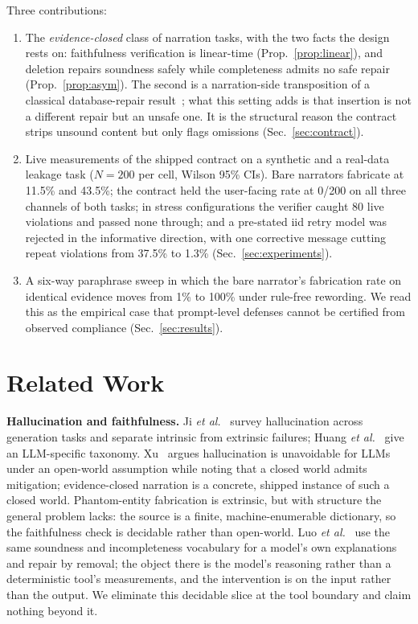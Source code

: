 \documentclass[conference]{IEEEtran}
\begin{document}
Three contributions:
\begin{enumerate}
\item The \emph{evidence-closed} class of narration tasks, with the two facts the design rests on: faithfulness verification is linear-time (Prop.~\ref{prop:linear}), and deletion repairs soundness safely while completeness admits no safe repair (Prop.~\ref{prop:asym}). The second is a narration-side transposition of a classical database-repair result~\cite{chomicki2005minimal}; what this setting adds is that insertion is not a different repair but an unsafe one. It is the structural reason the contract strips unsound content but only flags omissions (Sec.~\ref{sec:contract}).
\item Live measurements of the shipped contract on a synthetic and a real-data leakage task ($N=200$ per cell, Wilson 95\% CIs). Bare narrators fabricate at 11.5\% and 43.5\%; the contract held the user-facing rate at 0/200 on all three channels of both tasks; in stress configurations the verifier caught 80 live violations and passed none through; and a pre-stated iid retry model was rejected in the informative direction, with one corrective message cutting repeat violations from 37.5\% to 1.3\% (Sec.~\ref{sec:experiments}).
\item A six-way paraphrase sweep in which the bare narrator's fabrication rate on identical evidence moves from 1\% to 100\% under rule-free rewording. We read this as the empirical case that prompt-level defenses cannot be certified from observed compliance (Sec.~\ref{sec:results}).
\end{enumerate}

\section{Related Work}
\label{sec:related}
\textbf{Hallucination and faithfulness.} Ji \emph{et al.}~\cite{ji} survey hallucination across generation tasks and separate intrinsic from extrinsic failures; Huang \emph{et al.}~\cite{huang} give an LLM-specific taxonomy. Xu~\cite{xu2025openworld} argues hallucination is unavoidable for LLMs under an open-world assumption while noting that a closed world admits mitigation; evidence-closed narration is a concrete, shipped instance of such a closed world. Phantom-entity fabrication is extrinsic, but with structure the general problem lacks: the source is a finite, machine-enumerable dictionary, so the faithfulness check is decidable rather than open-world. Luo \emph{et al.}~\cite{luo2026removal} use the same soundness and incompleteness vocabulary for a model's own explanations and repair by removal; the object there is the model's reasoning rather than a deterministic tool's measurements, and the intervention is on the input rather than the output. We eliminate this decidable slice at the tool boundary and claim nothing beyond it.
\end{document}
